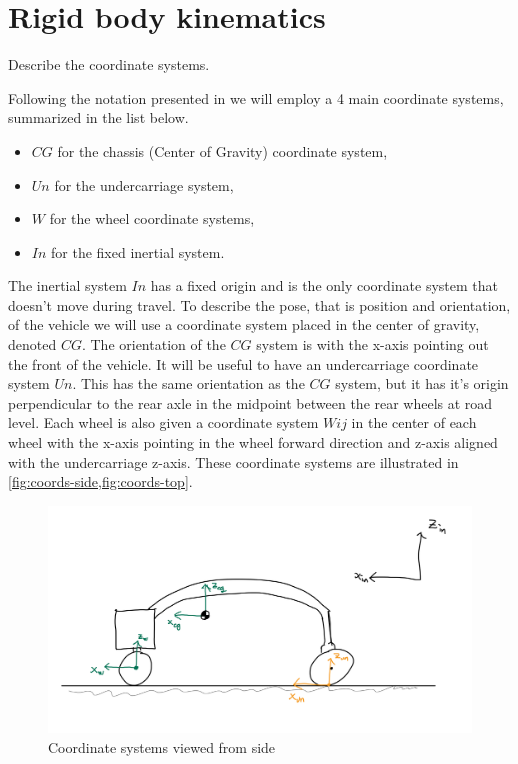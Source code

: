 \section{Rigid body kinematics}

Describe the coordinate systems.

Following the notation presented in \cite{kiencke} we will employ a 4 main coordinate systems, summarized in the list below.
\begin{itemize}
    \item $CG$ for the chassis (Center of Gravity) coordinate system,
    \item $Un$ for the undercarriage system,
    \item $W$ for the wheel coordinate systems,
    \item $In$ for the fixed inertial system.
\end{itemize}


The inertial system $In$ has a fixed origin and is the only coordinate system that doesn't move during travel. To describe the pose, that is position and orientation, of the vehicle we will use a coordinate system placed in the center of gravity, denoted $CG$. The orientation of the $CG$ system is with the x-axis pointing out the front of the vehicle. 
It will be useful to have an undercarriage coordinate system $Un$. This has the same orientation as the $CG$ system, but it has it's origin perpendicular to the rear axle in the midpoint between the rear wheels at road level. Each wheel is also given a coordinate system $Wij$ in the center of each wheel with the x-axis pointing in the wheel forward direction and z-axis aligned with the undercarriage z-axis. These coordinate systems are illustrated in \cref{fig:coords-side,fig:coords-top}. 

\begin{figure}
    \centering
    \includegraphics[width=\textwidth]{sections/figures/side-coordinate-systems-sketch.jpeg}
    \caption{Coordinate systems viewed from side}
    \label{fig:coords-side}
\end{figure}

